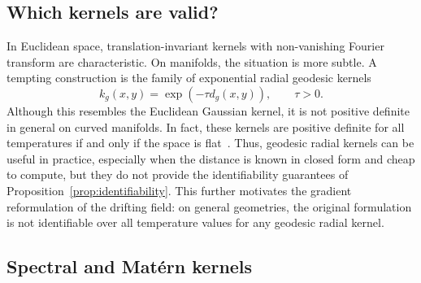 \documentclass{article}
\theoremstyle{plain}
\begin{document}
\subsection{Which kernels are valid?}
\label{sec:valid_kernels}
In Euclidean space, translation-invariant kernels with non-vanishing Fourier
transform are characteristic. On manifolds, the situation is more subtle. A tempting construction is the family of exponential radial geodesic kernels
\[
k_g(x,y)
=
\exp\!\left(
-\tau d_g(x,y)
\right),
\qquad
\tau>0.
\]
Although this resembles the Euclidean Gaussian kernel, it is not positive
definite in general on curved manifolds. In fact, these kernels are positive definite for all temperatures if and only if the space is flat~\citep{feragen2015geodesic,
jayasumana2015kernel,steinert2025universal}. Thus, geodesic radial kernels can be useful in practice, especially when the distance is known in closed form and cheap to compute, but they do not provide the identifiability guarantees of Proposition~\ref{prop:identifiability}. This further motivates the gradient reformulation of the drifting field: on general geometries, the original formulation is not identifiable over all temperature values for any geodesic radial kernel.


\subsection{Spectral and Matérn kernels}
\label{sec:spectral_matern_kernels}
\end{document}
